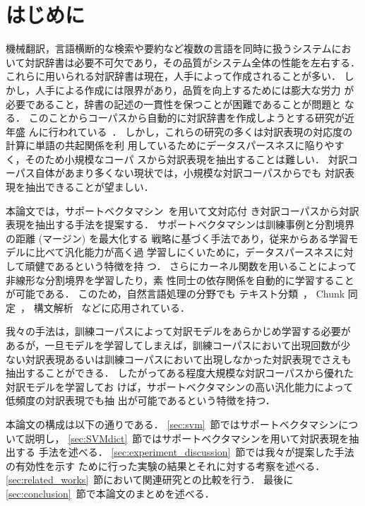 




\maketitle
\section{はじめに}
\label{sec:intro}
\thispagestyle{empty}
機械翻訳，言語横断的な検索や要約など複数の言語を同時に扱うシステムにお
いて対訳辞書は必要不可欠であり，その品質がシステム全体の性能を左右する．
これらに用いられる対訳辞書は現在，人手によって作成されることが多い．
しかし，人手による作成には限界があり，品質を向上するためには膨大な労力
が必要であること，辞書の記述の一貫性を保つことが困難であることが問題と
なる．
このことからコーパスから自動的に対訳辞書を作成しようとする研究が近年盛
んに行われている~\cite{tanaka_96,kitamura_97,melamed_97,yamamoto_01,kaji_01}．
しかし，これらの研究の多くは対訳表現の対応度の計算に単語の共起関係を利
用しているためにデータスパースネスに陥りやすく，そのため小規模なコーパ
スから対訳表現を抽出することは難しい．
対訳コーパス自体があまり多くない現状では，小規模な対訳コーパスからでも
対訳表現を抽出できることが望ましい．

本論文では，サポートベクタマシン~\cite{vapnik_book_99}を用いて文対応付
き対訳コーパスから対訳表現を抽出する手法を提案する．
サポートベクタマシンは訓練事例と分割境界の距離 (マージン) を最大化する
戦略に基づく手法であり，従来からある学習モデルに比べて汎化能力が高く過
学習しにくいために，データスパースネスに対して頑健であるという特徴を持
つ．
さらにカーネル関数を用いることによって非線形な分割境界を学習したり，素
性同士の依存関係を自動的に学習することが可能である．
このため，自然言語処理の分野でも
テキスト分類~\cite{joachims_98,taira_99}，
Chunk 同定~\cite{kudo_00b}，
構文解析~\cite{kudo_00a}
などに応用されている．

我々の手法は，訓練コーパスによって対訳モデルをあらかじめ学習する必要が
あるが，一旦モデルを学習してしまえば，訓練コーパスにおいて出現回数が少
ない対訳表現あるいは訓練コーパスにおいて出現しなかった対訳表現でさえも
抽出することができる．
したがってある程度大規模な対訳コーパスから優れた対訳モデルを学習してお
けば，サポートベクタマシンの高い汎化能力によって低頻度の対訳表現でも抽
出が可能であるという特徴を持つ．

本論文の構成は以下の通りである．
\ref{sec:svm}~節ではサポートベクタマシンについて説明し，
\ref{sec:SVMdict}~節ではサポートベクタマシンを用いて対訳表現を抽出する
手法を述べる．
\ref{sec:experiment_discussion}~節では我々が提案した手法の有効性を示す
ために行った実験の結果とそれに対する考察を述べる．
\ref{sec:related_works}~節において関連研究との比較を行う．
最後に \ref{sec:conclusion}~節で本論文のまとめを述べる．

